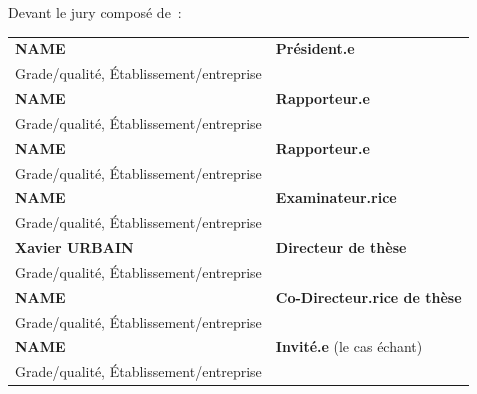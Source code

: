 \begin{titlepage}
\begin{center}
    \vspace{0.5cm}
    
    \end{center}
    
    Devant le jury composé de~:\\
    
    \small {
    \begin{tabular}{ll}
    \textbf{NAME}           &\textbf{Président.e}\\
      Grade/qualité, Établissement/entreprise\\
    \textbf{NAME}           &\textbf{Rapporteur.e}\\
      Grade/qualité, Établissement/entreprise\\
    \textbf{NAME}           &\textbf{Rapporteur.e}\\
      Grade/qualité, Établissement/entreprise\\
    \textbf{NAME}           &\textbf{Examinateur.rice}\\
      Grade/qualité, Établissement/entreprise\\
    \textbf{Xavier URBAIN}           &\textbf{Directeur de thèse}\\
      Grade/qualité, Établissement/entreprise\\
    \textbf{NAME} 		&\textbf{Co-Directeur.rice de thèse}\\
      Grade/qualité, Établissement/entreprise\\		
    \textbf{NAME}     &\textbf{Invité.e} (le cas échant)\\
      Grade/qualité, Établissement/entreprise\\
    \end{tabular}
    }
    
    
    \end{titlepage}